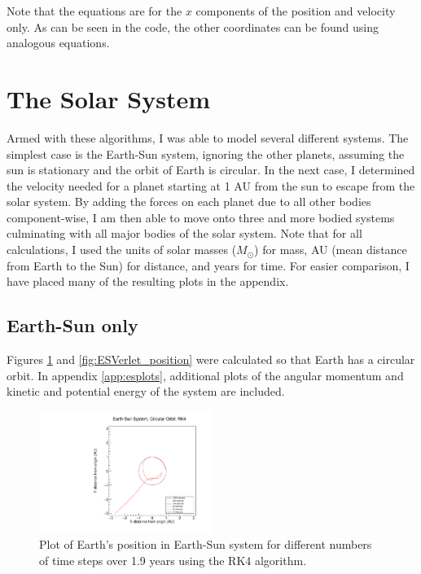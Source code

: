 \documentclass[a4paper,12pt]{report}
\begin{document}
Note that the equations are for the $x$ components of the position and velocity only. As can be seen in the code, the other coordinates can be found using analogous equations.

\section{The Solar System}\label{sec:ss}
Armed with these algorithms, I was able to model several different systems. The simplest case is the Earth-Sun system, ignoring the other planets, assuming the sun is stationary and the orbit of Earth is circular. In the next case, I determined the velocity needed for a planet starting at 1 AU from the sun to escape from the solar system. By adding the forces on each planet due to all other bodies component-wise, I am then able to move onto three and more bodied systems culminating with all major bodies of the solar system. Note that for all calculations, I used the units of solar masses ($M_\odot$) for mass, AU (mean distance from Earth to the Sun) for distance, and years for time. For easier comparison, I have placed many of the resulting plots in the appendix.

\subsection{Earth-Sun only}
Figures \ref{fig:ESRK4_position} and \ref{fig:ESVerlet_position} were calculated so that Earth has a circular orbit. In appendix \ref{app:esplots}, additional plots of the angular momentum and kinetic and potential energy of the system are included. 

 \begin{figure}
 \centering
   \includegraphics[width=0.5\textwidth]{ESRK4_position.pdf}
  \caption{Plot of Earth's position in Earth-Sun system for different numbers of time steps over 1.9 years using the RK4 algorithm.}
  \label{fig:ESRK4_position}
 \end{figure}
\end{document}
